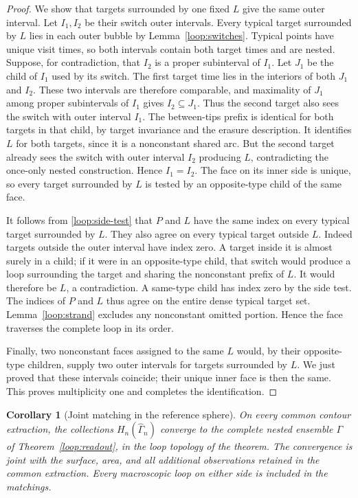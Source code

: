 \documentclass[11pt]{article}
\numberwithin{equation}{section}
\newtheorem{corollary}[theorem]{Corollary}
\theoremstyle{definition}
\theoremstyle{remark}
\newcommand{\1}{\mathbf 1}
\begin{document}
\begin{proof}
We show that targets surrounded by one fixed $L$ give the same outer
interval.  Let $I_1,I_2$ be their switch outer intervals.  Every typical
target surrounded by $L$ lies in each outer bubble by
Lemma~\ref{loop:switches}.  Typical points have unique visit times,
so both intervals contain both target times and are nested.  Suppose,
for contradiction, that $I_2$ is a proper subinterval of $I_1$.
Let $J_1$ be the child of $I_1$ used by its switch.  The first target
time lies in the interiors of both $J_1$ and $I_2$.  These two
intervals are therefore comparable, and maximality of $J_1$ among
proper subintervals of $I_1$ gives $I_2\subseteq J_1$.  Thus the
second target also sees the switch
with outer interval $I_1$.  The between-tips prefix is identical for
both targets in that child, by target invariance and the erasure
description.  It identifies $L$ for both targets, since it is a
nonconstant shared arc.  But the second target already sees the
switch with outer interval $I_2$ producing $L$, contradicting the
once-only nested construction.  Hence $I_1=I_2$.  The face on its
inner side is unique, so every target surrounded by $L$ is tested
by an opposite-type child of the same face.

It follows from \eqref{loop:side-test} that $P$ and $L$ have the
same index on every typical target surrounded by $L$.  They also
agree on every typical target outside $L$.  Indeed targets outside
the outer interval have index zero.  A target inside it is almost
surely in a child; if it were in an opposite-type child, that switch
would produce a loop surrounding the target and sharing the
nonconstant prefix of $L$.  It would therefore be $L$, a
contradiction.  A same-type child has index zero by the side test.
The indices of $P$ and $L$ thus agree on the entire dense typical
target set.  Lemma~\ref{loop:strand} excludes any nonconstant omitted
portion.  Hence the face traverses the complete loop in its order.

Finally, two nonconstant faces assigned to the same $L$ would, by
their opposite-type children, supply two outer intervals for targets
surrounded by $L$.  We just proved that these intervals coincide;
their unique inner face is then the same.  This proves multiplicity
one and completes the identification.
\end{proof}

\begin{corollary}[Joint matching in the reference sphere]
\label{loop:matching}
On every common contour extraction, the collections $H_n(\widehat\Gamma_n)$
converge to the complete nested ensemble $\Gamma$ of
Theorem~\ref{loop:readout}, in the loop topology of the theorem.
The convergence is joint with the surface, area, and all additional
observations retained in the common extraction.  Every macroscopic loop on either
side is included in the matchings.
\end{corollary}
\end{document}
